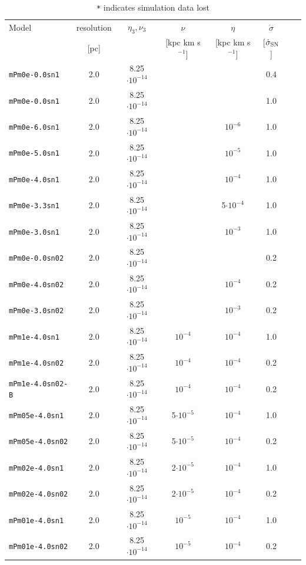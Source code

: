 \documentclass[preprint2]{aastex63}
\begin{document}
\begin{table}
\caption{\texttt{*} indicates simulation data lost}
\begin{tabular}{lccccccc}
Model             & resolution & $\eta_3,\nu_3$      & $\nu$            & $\eta$          & $\dot\sigma$ & \\
                  & [pc]       &                     & [kpc km s$^{-1}$]&[kpc km s$^{-1}$]&[$\dot\sigma_{\rm SN}$]& \\
\texttt{mPm0e-0.0sn1}    & 2.0 & 8.25$\cdot10^{-14}$ &                  &                 &  0.4 \\
\texttt{mPm0e-0.0sn1}    & 2.0 & 8.25$\cdot10^{-14}$ &                  &                 &  1.0 \\
\texttt{mPm0e-6.0sn1}    & 2.0 & 8.25$\cdot10^{-14}$ &                  & $     10^{-6}$  &  1.0 \\
\texttt{mPm0e-5.0sn1}    & 2.0 & 8.25$\cdot10^{-14}$ &                  & $     10^{-5}$  &  1.0 \\
\texttt{mPm0e-4.0sn1}    & 2.0 & 8.25$\cdot10^{-14}$ &                  & $     10^{-4}$  &  1.0 \\
\texttt{mPm0e-3.3sn1}    & 2.0 & 8.25$\cdot10^{-14}$ &                  & 5$\cdot10^{-4}$ &  1.0 \\
\texttt{mPm0e-3.0sn1}    & 2.0 & 8.25$\cdot10^{-14}$ &                  & $     10^{-3}$  &  1.0 \\
\texttt{mPm0e-0.0sn02}   & 2.0 & 8.25$\cdot10^{-14}$ &                  &                 &  0.2 \\
\texttt{mPm0e-4.0sn02}   & 2.0 & 8.25$\cdot10^{-14}$ &                  & $     10^{-4}$  &  0.2 \\
\texttt{mPm0e-3.0sn02}   & 2.0 & 8.25$\cdot10^{-14}$ &                  & $     10^{-3}$  &  0.2 \\
\texttt{mPm1e-4.0sn1}    & 2.0 & 8.25$\cdot10^{-14}$ & $     10^{-4}$   & $     10^{-4}$  &  1.0 \\
\texttt{mPm1e-4.0sn02}   & 2.0 & 8.25$\cdot10^{-14}$ & $     10^{-4}$   & $     10^{-4}$  &  0.2 \\
\texttt{mPm1e-4.0sn02-B} & 2.0 & 8.25$\cdot10^{-14}$ & $     10^{-4}$   & $     10^{-4}$  &  0.2 \\
\texttt{mPm05e-4.0sn1}   & 2.0 & 8.25$\cdot10^{-14}$ & 5$\cdot10^{-5}$  & $     10^{-4}$  &  1.0 \\
\texttt{mPm05e-4.0sn02}  & 2.0 & 8.25$\cdot10^{-14}$ & 5$\cdot10^{-5}$  & $     10^{-4}$  &  0.2 \\
\texttt{mPm02e-4.0sn1}   & 2.0 & 8.25$\cdot10^{-14}$ & 2$\cdot10^{-5}$  & $     10^{-4}$  &  1.0 \\
\texttt{mPm02e-4.0sn02}  & 2.0 & 8.25$\cdot10^{-14}$ & 2$\cdot10^{-5}$  & $     10^{-4}$  &  0.2 \\
\texttt{mPm01e-4.0sn1}   & 2.0 & 8.25$\cdot10^{-14}$ & $     10^{-5}$   & $     10^{-4}$  &  1.0 \\
\texttt{mPm01e-4.0sn02}  & 2.0 & 8.25$\cdot10^{-14}$ &       $10^{-5}$  & $     10^{-4}$  &  0.2 
\end{tabular}
\end{table}
\end{document}
